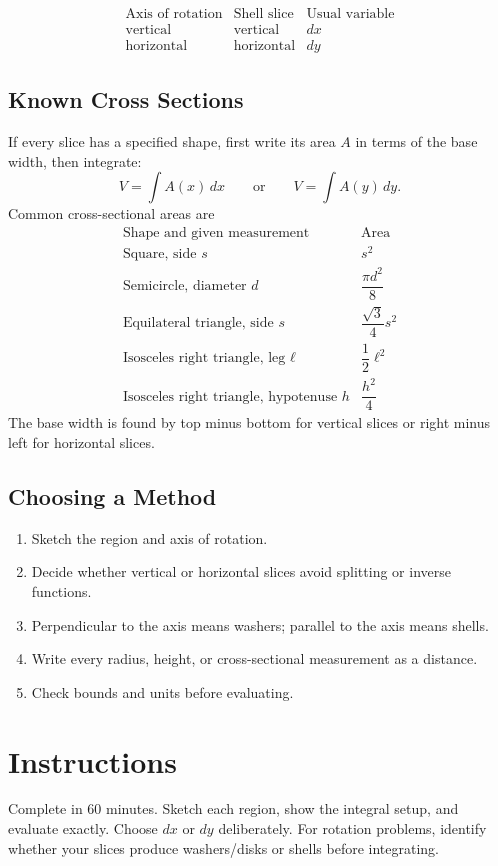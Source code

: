 \documentclass[12pt]{article}
\begin{document}
\[
\begin{array}{c|c|c}
\text{Axis of rotation} & \text{Shell slice} & \text{Usual variable}\\ \hline
\text{vertical} & \text{vertical} & dx\\
\text{horizontal} & \text{horizontal} & dy
\end{array}
\]

\subsection*{Known Cross Sections}
If every slice has a specified shape, first write its area $A$ in terms of the base width, then integrate:
\[
 V=\int A(x)\,dx
 \qquad\text{or}\qquad
 V=\int A(y)\,dy.
\]
Common cross-sectional areas are
\[
\begin{array}{c|c}
\text{Shape and given measurement} & \text{Area}\\ \hline
\text{Square, side }s & s^2\\
\text{Semicircle, diameter }d & \dfrac{\pi d^2}{8}\\
\text{Equilateral triangle, side }s & \dfrac{\sqrt3}{4}s^2\\
\text{Isosceles right triangle, leg }\ell & \dfrac12\ell^2\\
\text{Isosceles right triangle, hypotenuse }h & \dfrac{h^2}{4}
\end{array}
\]
The base width is found by top minus bottom for vertical slices or right minus left for horizontal slices.

\subsection*{Choosing a Method}
\begin{enumerate}[leftmargin=1.6em,itemsep=0.2em]
  \item Sketch the region and axis of rotation.
  \item Decide whether vertical or horizontal slices avoid splitting or inverse functions.
  \item Perpendicular to the axis means washers; parallel to the axis means shells.
  \item Write every radius, height, or cross-sectional measurement as a distance.
  \item Check bounds and units before evaluating.
\end{enumerate}

\clearpage
\section*{Instructions}
Complete in 60 minutes. Sketch each region, show the integral setup, and evaluate exactly. Choose $dx$ or $dy$ deliberately. For rotation problems, identify whether your slices produce washers/disks or shells before integrating.
\end{document}
